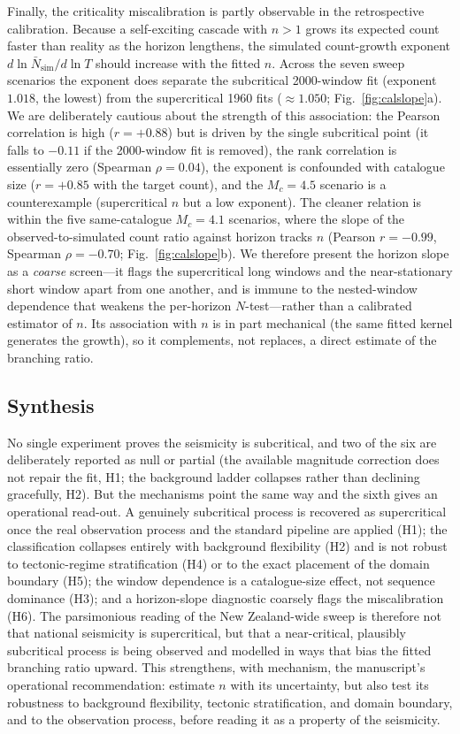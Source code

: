 Finally, the criticality miscalibration is partly observable in the retrospective
calibration. Because a self-exciting cascade with $n>1$ grows its expected count
faster than reality as the horizon lengthens, the simulated count-growth exponent
$d\ln\bar N_{\mathrm{sim}}/d\ln T$ should increase with the fitted $n$. Across the
seven sweep scenarios the exponent does separate the subcritical 2000-window fit
(exponent $1.018$, the lowest) from the supercritical 1960 fits ($\approx1.050$;
Fig.~\ref{fig:calslope}a). We are deliberately cautious about the strength of this
association: the Pearson correlation is high ($r=+0.88$) but is driven by the
single subcritical point (it falls to $-0.11$ if the 2000-window fit is removed),
the rank correlation is essentially zero (Spearman $\rho=0.04$), the exponent is
confounded with catalogue size ($r=+0.85$ with the target count), and the
$M_c=4.5$ scenario is a counterexample (supercritical $n$ but a low exponent). The
cleaner relation is within the five same-catalogue $M_c=4.1$ scenarios, where the
slope of the observed-to-simulated count ratio against horizon tracks $n$ (Pearson
$r=-0.99$, Spearman $\rho=-0.70$; Fig.~\ref{fig:calslope}b). We therefore present
the horizon slope as a \emph{coarse} screen---it flags the supercritical long
windows and the near-stationary short window apart from one another, and is immune
to the nested-window dependence that weakens the per-horizon $N$-test---rather than
a calibrated estimator of $n$. Its association with $n$ is in part mechanical (the
same fitted kernel generates the growth), so it complements, not replaces, a direct
estimate of the branching ratio.

\subsection*{Synthesis}

No single experiment proves the seismicity is subcritical, and two of the six are
deliberately reported as null or partial (the available magnitude correction does
not repair the fit, H1; the background ladder collapses rather than declining
gracefully, H2). But the mechanisms point the same way and the sixth gives an
operational read-out. A genuinely subcritical process is recovered as supercritical
once the real observation process and the standard pipeline are applied (H1); the
classification collapses entirely with background flexibility (H2) and is not robust
to tectonic-regime stratification (H4) or to the exact placement of the domain
boundary (H5); the window dependence is a catalogue-size effect, not sequence
dominance (H3); and a horizon-slope diagnostic coarsely flags the miscalibration
(H6). The parsimonious
reading of the New Zealand-wide sweep is therefore not that national seismicity is
supercritical, but that a near-critical, plausibly subcritical process is being
observed and modelled in ways that bias the fitted branching ratio upward. This
strengthens, with mechanism, the manuscript's operational recommendation: estimate
$n$ with its uncertainty, but also test its robustness to background flexibility,
tectonic stratification, and domain boundary, and to the observation process,
before reading it as a property of the seismicity.

